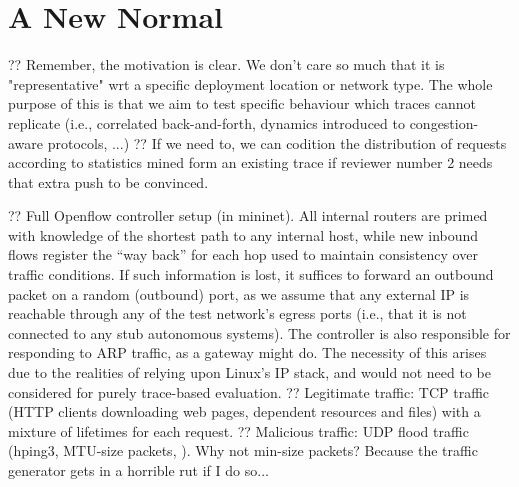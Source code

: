\documentclass[conference, letterpaper, 10pt, times]{IEEEtran}
\begin{document}
%

\section{A New Normal}\label{sec:a-new-normal}

%

?? Remember, the motivation is clear. We don't care so much that it is "representative" wrt a specific deployment location or network type. The whole purpose of this is that we aim to test specific behaviour which traces cannot replicate (i.e., correlated back-and-forth, dynamics introduced to congestion-aware protocols, ...)
?? If we need to, we can codition the distribution of requests according to statistics mined form an existing trace if reviewer number 2 needs that extra push to be convinced.

?? Full Openflow controller setup (in mininet). All internal routers are primed with knowledge of the shortest path to any internal host, while new inbound flows register the ``way back'' for each hop used to maintain consistency over traffic conditions.
If such information is lost, it suffices to forward an outbound packet on a random (outbound) port, as we assume that any external IP is reachable through any of the test network's egress ports (i.e., that it is not connected to any stub autonomous systems).
The controller is also responsible for responding to ARP traffic, as a gateway might do.
The necessity of this arises due to the realities of relying upon Linux's IP stack, and would not need to be considered for purely trace-based evaluation.
?? Legitimate traffic: TCP traffic (HTTP clients downloading web pages, dependent resources and files) with a mixture of lifetimes for each request.
?? Malicious traffic: UDP flood traffic (hping3, MTU-size packets, ). Why not min-size packets? Because the traffic generator gets in a horrible rut if I do so...
\end{document}
